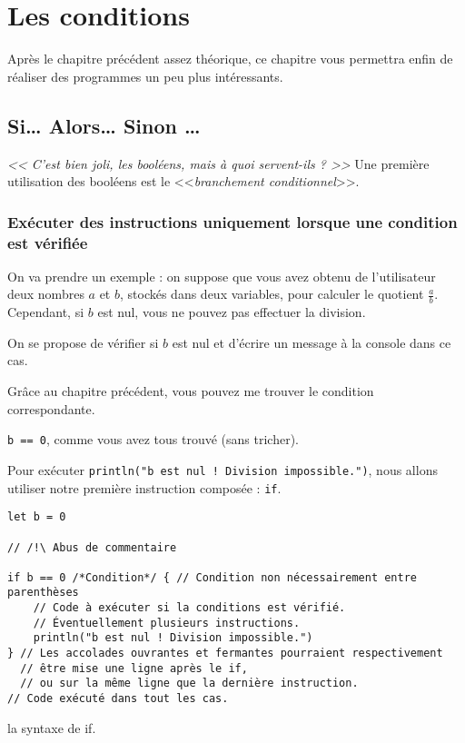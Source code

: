 \chapter{Les conditions}
Après le chapitre précédent assez théorique, ce chapitre vous permettra enfin de réaliser des programmes un peu plus intéressants.
\section{Si… Alors… Sinon …}
\emph{<< C'est bien joli, les booléens, mais à quoi servent-ils ? >>}
Une première utilisation des booléens est le <<\emph{branchement conditionnel}>>.
\subsection{Exécuter des instructions uniquement lorsque une condition est vérifiée}
On va prendre un exemple : on suppose que vous avez obtenu de l'utilisateur deux nombres $a$ et $b$, stockés dans deux variables, pour calculer le quotient $\frac{a}{b}$.
Cependant, si $b$ est nul, vous ne pouvez pas effectuer la division. %

On se propose de vérifier si $b$ est nul et d'écrire un message à la console dans ce cas.

Grâce au chapitre précédent, vous pouvez me trouver le condition correspondante.

\pagebreak %
\texttt{b == 0}, comme vous avez tous trouvé (sans tricher).

Pour exécuter \texttt{println("b est nul ! Division impossible.")}, nous allons utiliser notre première instruction composée : \texttt{if}.

\begin{listing}[h]
\begin{verbatim}
let b = 0

// /!\ Abus de commentaire

if b == 0 /*Condition*/ { // Condition non nécessairement entre parenthèses
    // Code à exécuter si la conditions est vérifié.
    // Éventuellement plusieurs instructions.
    println("b est nul ! Division impossible.")
} // Les accolades ouvrantes et fermantes pourraient respectivement
  // être mise une ligne après le if,
  // ou sur la même ligne que la dernière instruction.
// Code exécuté dans tout les cas.
\end{verbatim}
\caption{la syntaxe de if.}
\end{listing}
